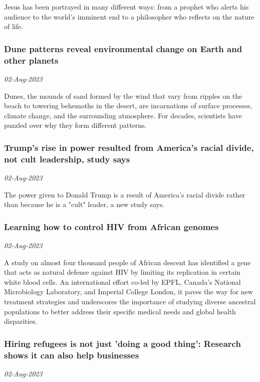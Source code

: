 Jesus has been portrayed in many different ways: from a prophet who alerts his audience to the world's imminent end to a philosopher who reflects on the nature of life.
\subsubsection{Dune patterns reveal environmental change on Earth and other planets \href{https://phys.org/news/2023-08-dune-patterns-reveal-environmental-earth.html}{}}
\textit{02-Aug-2023}

Dunes, the mounds of sand formed by the wind that vary from ripples on the beach to towering behemoths in the desert, are incarnations of surface processes, climate change, and the surrounding atmosphere. For decades, scientists have puzzled over why they form different patterns.
\subsubsection{Trump's rise in power resulted from America's racial divide, not cult leadership, study says \href{https://phys.org/news/2023-08-trump-power-resulted-america-racial.html}{}}
\textit{02-Aug-2023}

The power given to Donald Trump is a result of America's racial divide rather than because he is a "cult" leader, a new study says.
\subsubsection{Learning how to control HIV from African genomes \href{https://phys.org/news/2023-08-hiv-african-genomes.html}{}}
\textit{02-Aug-2023}

A study on almost four thousand people of African descent has identified a gene that acts as natural defense against HIV by limiting its replication in certain white blood cells. An international effort co-led by EPFL, Canada's National Microbiology Laboratory, and Imperial College London, it paves the way for new treatment strategies and underscores the importance of studying diverse ancestral populations to better address their specific medical needs and global health disparities.
\subsubsection{Hiring refugees is not just 'doing a good thing': Research shows it can also help businesses \href{https://phys.org/news/2023-08-hiring-refugees-good-businesses.html}{}}
\textit{02-Aug-2023}

